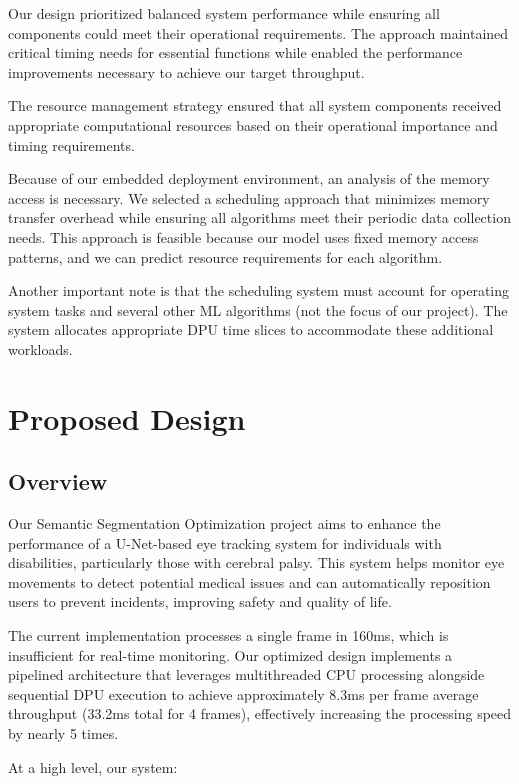 Our design prioritized balanced system performance while ensuring all components could meet their operational requirements. The approach maintained critical timing needs for essential functions while enabled the performance improvements necessary to achieve our target throughput.

The resource management strategy ensured that all system components received appropriate computational resources based on their operational importance and timing requirements.

Because of our embedded deployment environment, an analysis of the memory access is necessary. We selected a scheduling approach that minimizes memory transfer overhead while ensuring all algorithms meet their periodic data collection needs. This approach is feasible because our model uses fixed memory access patterns, and we can predict resource requirements for each algorithm.

Another important note is that the scheduling system must account for operating system tasks and several other ML algorithms (not the focus of our project). The system allocates appropriate DPU time slices to accommodate these additional workloads.

\section{Proposed Design}\label{sec:proposed-design}

\subsection{Overview}\label{subsec:overview}

Our Semantic Segmentation Optimization project aims to enhance the performance of a U-Net-based eye tracking system for individuals with disabilities, particularly those with cerebral palsy. This system helps monitor eye movements to detect potential medical issues and can automatically reposition users to prevent incidents, improving safety and quality of life.

The current implementation processes a single frame in 160ms, which is insufficient for real-time monitoring. Our optimized design implements a pipelined architecture that leverages multithreaded CPU processing alongside sequential DPU execution to achieve approximately 8.3ms per frame average throughput (33.2ms total for 4 frames), effectively increasing the processing speed by nearly 5 times.

At a high level, our system:


